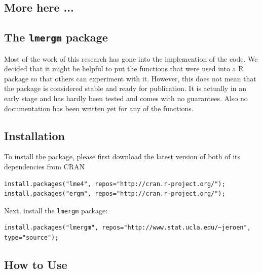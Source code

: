 \documentclass[a4paper]{article}
\begin{document}
\subsection{More here ...}



\clearpage
\begin{appendices}

\section{The \texttt{lmergm} package}
\label{appendix.package}

Most of the work of this research has gone into the implemention of the code. We decided that it might be helpful to put the functions
that were used into a R package so that others can experiment with it. However, this does not mean that the package is 
considered stable and ready for publication. It is actually in an early stage and has hardly been tested and comes with no guarantees.
Also no documentation has been written yet for any of the functions.

\subsection*{Installation}

To install the package, please first download the latest version of both of its dependencies from CRAN
\begin{verbatim}
install.packages("lme4", repos="http://cran.r-project.org/");
install.packages("ergm", repos="http://cran.r-project.org/");
\end{verbatim}
Next, install the \texttt{lmergm} package:
\begin{verbatim}
install.packages("lmergm", repos="http://www.stat.ucla.edu/~jeroen", type="source");
\end{verbatim}

\subsection*{How to Use}


\end{appendices}
\end{document}
